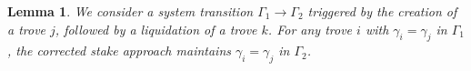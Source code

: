 \documentclass[reqno]{article}
\newtheorem{lemma}[theorem]{Lemma}
\begin{document}





\begin{lemma}\label{result:1} We consider a system transition $\Gamma_1 \rightarrow \Gamma_2$ triggered by the creation of a trove $j$, followed by a liquidation of a trove $k$. For any trove $i$ with $\gamma_i = \gamma_j$ in $\Gamma_1$, the corrected stake approach maintains $\gamma_i = \gamma_j$ in $\Gamma_2$.
\end{lemma}
\end{document}
